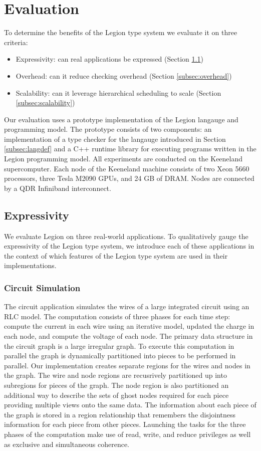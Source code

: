 
\section{Evaluation}
\label{sec:evaluation}

To determine the benefits of the Legion type system we evaluate
it on three criteria:
\begin{itemize}
\item Expressivity: can real applications be expressed (Section \ref{subsec:expressivity})
\item Overhead: can it reduce checking overhead (Section \ref{subsec:overhead})
\item Scalability: can it leverage hierarchical scheduling to scale (Section \ref{subsec:scalability})
\end{itemize}
Our evaluation uses a prototype implementation of the Legion langauge and programming model.
The prototype consists of two components: an implementation of a type checker
for the langauge introduced in Section \ref{subsec:langdef} and a C++ runtime library
for executing programs written in the Legion programming model\cite{Legion12}.  All experiments
are conducted on the Keeneland supercomputer\cite{Keeneland}.  Each node of the Keeneland
machine consists of two Xeon 5660 processors, three Tesla M2090 GPUs, and 24 GB of DRAM.  Nodes
are connected by a QDR Infiniband interconnect.

\subsection{Expressivity}
\label{subsec:expressivity}
We evaluate Legion on three real-world applications.  To qualitatively gauge the 
expressivity of the Legion type system, we introduce each of these applications in
the context of which features of the Legion type system are used in their implementations.

\subsubsection{Circuit Simulation}
\label{subsec:circuit}
The circuit application simulates the wires of a large integrated circuit using an RLC
model.  The computation consists of three phases for each time step: compute the current in each wire using
an iterative model, updated the charge in each node, and compute the voltage of each node.
The primary data structure in the circuit graph is a large irregular graph.  To execute
this computation in parallel the graph is dynamically partitioned into pieces to be
performed in parallel.  Our implementation creates separate regions for the wires and
nodes in the graph.  The wire and node regions are recusrively partitioned up into
subregions for pieces of the graph.  The node region is also partitioned an additional way to 
describe the sets of ghost nodes required for each piece providing multiple views onto the
same data.  The information about each piece of the graph is stored
in a region relationship that remembers the disjointness information for each piece
from other pieces.  Launching the tasks for the three phases of the computation make 
use of read, write, and reduce privileges as well as exclusive and simultaneous coherence.

